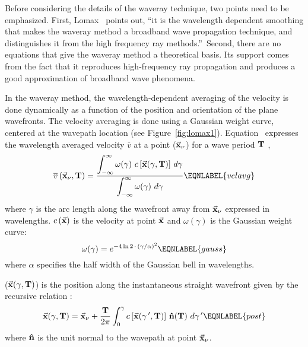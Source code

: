 Before considering the details of the waveray technique, two points
need to be emphasized.
First, Lomax~ points out, ``it 
is the wavelength
dependent smoothing that makes the waveray method a broadband
wave propagation technique, and distinguishes it from the
high frequency ray methods.''\  Second, there are no equations that
give the waveray method a theoretical basis.
Its support comes from
the fact that it reproduces high-frequency ray propagation and 
produces a good approximation of broadband wave phenomena.



In the waveray method, the wavelength-dependent
averaging of the velocity is done dynamically as a function
of the position and orientation of the plane wavefronts.
The velocity
averaging is done using a Gaussian weight curve, centered at the wavepath
location (see Figure~\ref{fig:lomax1}). Equation~ expresses the
wavelength averaged velocity \( \overline{v} \) at a point 
($ \vec{\bf x}_{\nu} $) for a wave period $\bf T$ \cite{Lomax},
%
\begin{equation}
 \overline{v}\, (\vec{\bf x}_{\nu},{\bf T\/}) = \frac{
  \displaystyle \int_{-\infty}^{\infty}
  \omega(\gamma)\
  c\, [\vec{\bf x}(\gamma, {\bf T\/})]\
  d\gamma}
  {\displaystyle \int_{-\infty}^{\infty}
  \omega(\gamma)\ d\gamma}
\EQNLABEL{velavg}
\end{equation}
%
where $\gamma$ is the arc length along the wavefront away from 
\( \vec{\bf x}_{\nu} \) expressed in wavelengths.
\( c\, (\vec{\bf x}) \) is the velocity at point \( \vec{\bf x} \)
and \( \omega(\gamma) \) is the Gaussian weight curve:
%
\begin{equation}
 \omega(\gamma) = e^{-4 \ln 2\, \cdot\, (\gamma/\alpha)^{2}}
\EQNLABEL{gauss}
\end{equation}
%
where $\alpha$ specifies the half width of the Gaussian bell in
wavelengths.

($\vec{\bf x}(\gamma,{\bf T\/})$) is the position along the 
instantaneous straight wavefront given by the recursive relation
\cite{Lomax}:
%
\begin{equation}
 \vec{\bf x}(\gamma, {\bf T\/}) = \vec{\bf x}_{\nu} + \frac{{\bf T\/}}{2 \pi}
 \int_{0}^{\gamma} c\, [\vec{\bf x}(\gamma\, ', {\bf T\/})]\
 {\bf \hat{n}}({\bf T\/})\
 d\gamma\, '
\EQNLABEL{post}
\end{equation}
%
where \( {\bf \hat{n}} \) is the unit normal to the wavepath at
point \( \vec{\bf x}_{\nu} \).

